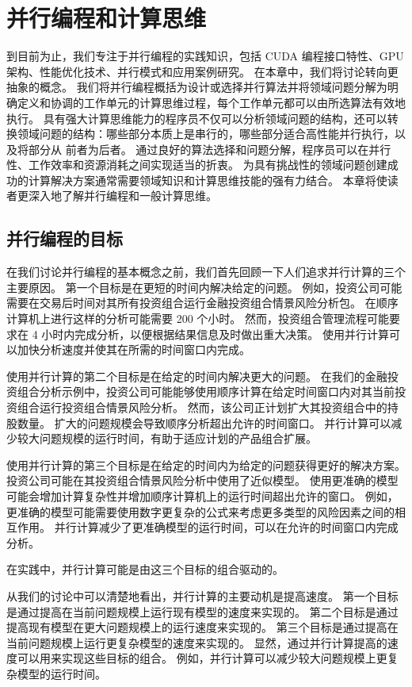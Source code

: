 \section{并行编程和计算思维}
到目前为止，我们专注于并行编程的实践知识，包括 CUDA 编程接口特性、GPU 架构、性能优化技术、并行模式和应用案例研究。 在本章中，我们将讨论转向更抽象的概念。 我们将并行编程概括为设计或选择并行算法并将领域问题分解为明确定义和协调的工作单元的计算思维过程，每个工作单元都可以由所选算法有效地执行。 具有强大计算思维能力的程序员不仅可以分析领域问题的结构，还可以转换领域问题的结构：哪些部分本质上是串行的，哪些部分适合高性能并行执行，以及将部分从 前者为后者。 通过良好的算法选择和问题分解，程序员可以在并行性、工作效率和资源消耗之间实现适当的折衷。 为具有挑战性的领域问题创建成功的计算解决方案通常需要领域知识和计算思维技能的强有力结合。 本章将使读者更深入地了解并行编程和一般计算思维。

\subsection{并行编程的目标}
在我们讨论并行编程的基本概念之前，我们首先回顾一下人们追求并行计算的三个主要原因。 第一个目标是在更短的时间内解决给定的问题。 例如，投资公司可能需要在交易后时间对其所有投资组合运行金融投资组合情景风险分析包。 在顺序计算机上进行这样的分析可能需要 200 个小时。 然而，投资组合管理流程可能要求在 4 小时内完成分析，以便根据结果信息及时做出重大决策。 使用并行计算可以加快分析速度并使其在所需的时间窗口内完成。

使用并行计算的第二个目标是在给定的时间内解决更大的问题。 在我们的金融投资组合分析示例中，投资公司可能能够使用顺序计算在给定时间窗口内对其当前投资组合运行投资组合情景风险分析。 然而，该公司正计划扩大其投资组合中的持股数量。 扩大的问题规模会导致顺序分析超出允许的时间窗口。 并行计算可以减少较大问题规模的运行时间，有助于适应计划的产品组合扩展。

使用并行计算的第三个目标是在给定的时间内为给定的问题获得更好的解决方案。 投资公司可能在其投资组合情景风险分析中使用了近似模型。 使用更准确的模型可能会增加计算复杂性并增加顺序计算机上的运行时间超出允许的窗口。 例如，更准确的模型可能需要使用数字更复杂的公式来考虑更多类型的风险因素之间的相互作用。 并行计算减少了更准确模型的运行时间，可以在允许的时间窗口内完成分析。

在实践中，并行计算可能是由这三个目标的组合驱动的。

从我们的讨论中可以清楚地看出，并行计算的主要动机是提高速度。 第一个目标是通过提高在当前问题规模上运行现有模型的速度来实现的。 第二个目标是通过提高现有模型在更大问题规模上的运行速度来实现的。 第三个目标是通过提高在当前问题规模上运行更复杂模型的速度来实现的。 显然，通过并行计算提高的速度可以用来实现这些目标的组合。 例如，并行计算可以减少较大问题规模上更复杂模型的运行时间。

